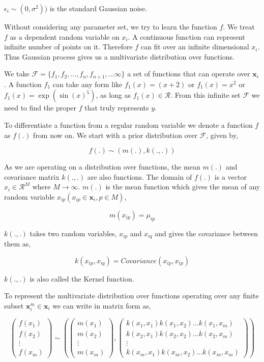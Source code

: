 \documentclass[english]{tktltiki}
\begin{document}
$\epsilon_i \sim (0, \sigma^2))$ is the standard Gaussian noise.

Without considering any parameter set, we try to learn the function $f$. We treat $f$ as a dependent random variable on $x_i$. A continuous function can represent infinite number of points on it. Therefore $f$ can fit over an infinite dimensional $x_i$. Thus Gaussian process gives us a multivariate distribution over functions.

We take $\mathcal{F} = \{f_1, f_2, ..., f_n, f_{n+1}, ... \infty\}$ a set of functions that can operate over $\mathbf{x}_i$. A function $f_1$ can take any form like $f_1(x) = (x + 2)$ or $f_1(x) = x^2$ or $f_1(x) = \exp(\sin(x)^5)$, as long as $f_1(x) \in \mathcal{R}$. From this infinite set $\mathcal{F}$ we need to find the proper $f$ that truly represents $y$.

To differentiate a function from a regular random variable we denote a function $f$ as $f(.)$ from now on. We start with a prior distribution over $\mathcal{F}$, given by,

\begin{equation}
f(.) \sim (m(.), k(.,.))
\end{equation}

As we are operating on a distribution over functions, the mean $m(.)$ and covariance matrix $k(.,.)$ are also functions. The domain of $f(.)$ is a vector $x_i \in \mathcal{R}^M$ where $M \to \infty$. $m(.)$ is the mean function which gives the mean of any random variable $x_{ip} (x_{ip} \in \mathbf{x}_i, p \in M)$,

$$
m(x_{ip}) = \mu_{ip}
$$

$k(.,.)$ takes two random variables, $x_{ip}$ and $x_{iq}$ and gives the covariance between them as,

$$
k(x_{ip}, x_{iq}) = Covariance(x_{ip}, x_{ip})
$$

$k(.,.)$ is also called the Kernel function.

To represent the multivariate distribution over functions operating over any finite subset $\mathbf{x}_i^m \in \mathbf{x}_i$ we can write in matrix form as,

$$
\begin{pmatrix}
f(x_1) \\
f(x_2) \\
\vdots \\
f(x_m)
\end{pmatrix}
\sim\left(%
\begin{pmatrix}
m(x_1) \\
m(x_2) \\
\vdots \\
m(x_m)
\end{pmatrix}
,%
\begin{pmatrix}
k(x_1, x_1) k(x_1, x_2) \hdots k(x_1, x_m) \\
k(x_2, x_1) k(x_2, x_2) \hdots k(x_2, x_m) \\
\vdots \\
k(x_m, x_1) k(x_m, x_2) \hdots k(x_m, x_m) 
\end{pmatrix}\right)
$$
\end{document}
